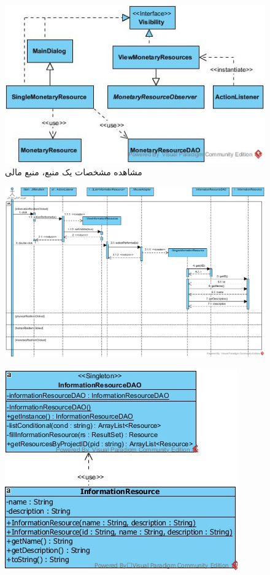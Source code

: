\begin{landscape}
\begin{figure}[H]
	\includegraphics[scale=0.6]{img/sequence-design/ViewResourceAttributes_MONETARYUI}
	\caption{مشاهده مشخصات یک منبع، منبع مالی}
\end{figure}
\begin{figure}[H]
	\centering
	\includegraphics[scale=0.8]{img/sequence-design/ViewResourceAttributes_INFORMATION}
\end{figure}
\begin{figure}[H]
	\centering
	\includegraphics[scale=0.6]{img/sequence-design/ViewResourceAttributes_INFORMATIONC}

\end{figure}
\end{landscape}
